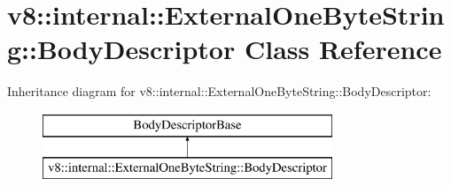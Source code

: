 \hypertarget{classv8_1_1internal_1_1_external_one_byte_string_1_1_body_descriptor}{}\section{v8\+:\+:internal\+:\+:External\+One\+Byte\+String\+:\+:Body\+Descriptor Class Reference}
\label{classv8_1_1internal_1_1_external_one_byte_string_1_1_body_descriptor}
Inheritance diagram for v8\+:\+:internal\+:\+:External\+One\+Byte\+String\+:\+:Body\+Descriptor\+:\begin{figure}[H]
\begin{center}
\leavevmode
\includegraphics[height=2.000000cm]{classv8_1_1internal_1_1_external_one_byte_string_1_1_body_descriptor}
\end{center}
\end{figure}
